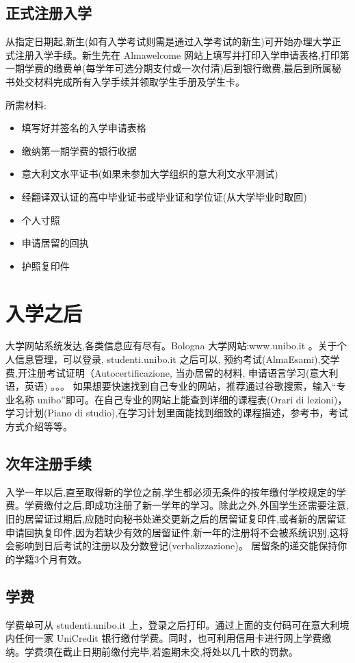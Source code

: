 \subsection{正式注册入学}
从指定日期起,新生(如有入学考试则需是通过入学考试的新生)可开始办理大学正式注册入学手续。新生先在 Almawelcome 网站上填写并打印入学申请表格,打印第一期学费的缴费单(每学年可选分期支付或一次付清)后到银行缴费,最后到所属秘书处交材料完成所有入学手续并领取学生手册及学生卡。 

所需材料:
\begin{itemize}
\item 填写好并签名的入学申请表格 
\item 缴纳第一期学费的银行收据 
\item 意大利文水平证书(如果未参加大学组织的意大利文水平测试) 
\item 经翻译双认证的高中毕业证书或毕业证和学位证(从大学毕业时取回)
\item 个人寸照
\item 申请居留的回执
\item 护照复印件 
\end{itemize}




\section{入学之后}
大学网站系统发达,各类信息应有尽有。Bologna 大学网站:www.unibo.it 。关于个人信息管理，可以登录, studenti.unibo.it 之后可以, 预约考试(AlmaEsami),交学费,开注册考试证明（Autocertificazione, 当办居留的材料, 申请语言学习(意大利语，英语) 。。。
如果想要快速找到自己专业的网站，推荐通过谷歌搜索，输入“专业名称 unibo”即可。在自己专业的网站上能查到详细的课程表(Orari di lezioni)，学习计划(Piano di studio),在学习计划里面能找到细致的课程描述，参考书，考试方式介绍等等。

\subsection{次年注册手续}
入学一年以后,直至取得新的学位之前,学生都必须无条件的按年缴付学校规定的学费。学费缴付之后,即成功注册了新一学年的学习。除此之外,外国学生还需要注意,旧的居留证过期后,应随时向秘书处递交更新之后的居留证复印件,或者新的居留证申请回执复印件,因为若缺少有效的居留证件,新一年的注册将不会被系统识别,这将会影响到日后考试的注册以及分数登记(verbalizzazione)。 居留条的递交能保持你的学籍3个月有效。

\subsection{学费}
学费单可从 studenti.unibo.it 上，登录之后打印。通过上面的支付码可在意大利境内任何一家 UniCredit 银行缴付学费。同时，也可利用信用卡进行网上学费缴纳。学费须在截止日期前缴付完毕,若逾期未交,将处以几十欧的罚款。 


